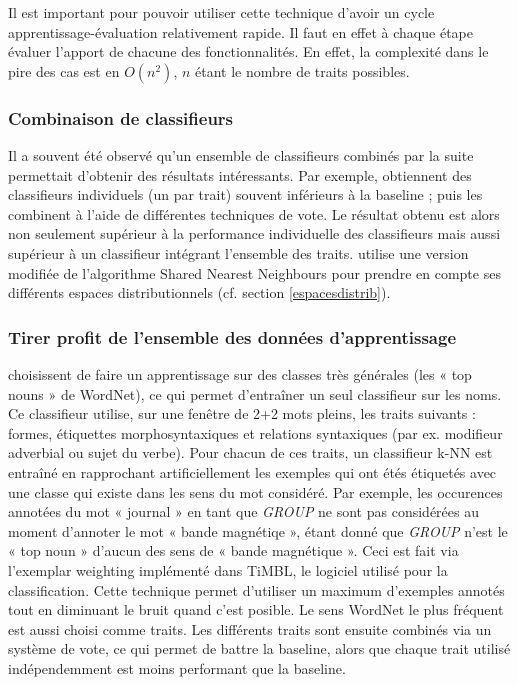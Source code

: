 Il est important pour pouvoir utiliser cette technique d'avoir un cycle apprentissage-évaluation relativement rapide. Il faut en effet à chaque étape évaluer l'apport de chacune des fonctionnalités. En effet, la complexité dans le pire des cas est en $O(n^2)$, $n$ étant le nombre de traits possibles.

\subsubsection{Combinaison de classifieurs}

Il a souvent été observé qu'un ensemble de classifieurs combinés par la suite permettait d'obtenir des résultats intéressants. Par exemple, \cite{kohomban2005learning,dinu2007sometimes} obtiennent des classifieurs individuels (un par trait) souvent inférieurs à la baseline ; puis les combinent à l'aide de différentes techniques de vote. Le résultat obtenu est alors non seulement supérieur à la performance individuelle des classifieurs mais aussi supérieur à un classifieur intégrant l'ensemble des traits. \cite{mouton2009induction} utilise une version modifiée de l'algorithme Shared Nearest Neighbours pour prendre en compte ses différents espaces distributionnels  (cf. section \ref{espacesdistrib}).

\subsubsection{Tirer profit de l'ensemble des données d'apprentissage}

\cite{kohomban2005learning} choisissent de faire un apprentissage sur des classes très générales (les « top nouns » de WordNet), ce qui permet d'entraîner un seul classifieur sur les noms. Ce classifieur utilise, sur une fenêtre de 2+2 mots pleins, les traits suivants : formes, étiquettes morphosyntaxiques et relations syntaxiques (par ex. modifieur adverbial ou sujet du verbe). Pour chacun de ces traits, un classifieur k-NN est entraîné en rapprochant artificiellement les exemples qui ont étés étiquetés avec une classe qui existe dans les sens du mot considéré. Par exemple, les occurences annotées du mot « journal » en tant que \textit{GROUP} ne sont pas considérées au moment d'annoter le mot « bande magnétiqe », étant donné que \textit{GROUP} n'est le « top noun » d'aucun des sens de « bande magnétique ». Ceci est fait via l'exemplar weighting implémenté dans TiMBL, le logiciel utilisé pour la classification. Cette technique permet d'utiliser un maximum d'exemples annotés tout en diminuant le bruit quand c'est posible. Le sens WordNet le plus fréquent est aussi choisi comme traits. Les différents traits sont ensuite combinés via un système de vote, ce qui permet de battre la baseline, alors que chaque trait utilisé indépendemment est moins performant que la baseline.

